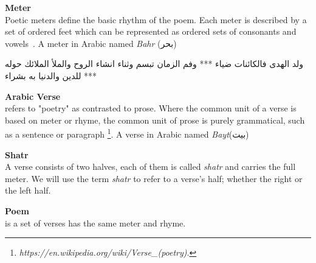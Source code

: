 
    \newpage
\begin{definition}\label{def:meter}
  \textbf{Meter} \hfill \\
  Poetic meters define the basic rhythm of the poem. Each meter is described by a set of ordered feet which can be represented as ordered sets of consonants and vowels~\cite{Almuhareb2015}. A meter in Arabic named \textit{Bahr}   (\textarabic{بحر})
\begin{Arabic}
	\begin{traditionalpoem*}
          ولد الهدى فالكائنات ضياء *** وفم الزمان تبسم وثناء انشاء
          الروح والملأ الملائك حوله *** للدين والدنيا به بشراء

	\end{traditionalpoem*}
\end{Arabic}%
\end{definition}

\begin{definition}\label{def:verse}
  \textbf{Arabic Verse} \hfill \\ refers to "poetry" as contrasted to prose. Where the common unit of a verse is based on meter or rhyme, the common unit of prose is purely grammatical, such as a sentence or paragraph \footnote{\textit{ https://en.wikipedia.org/wiki/Verse\_(poetry)}.}. A verse in Arabic named \textit{Bayt}(\textarabic{بيت})
\end{definition}

\begin{definition}\label{def:shatr}
  \textbf{Shatr} \hfill \\  A verse consists of two halves, each of them is called \textit{shatr} and carries the full meter.  We will use the term \textit{shatr} to refer to a verse's half; whether the right or the left half.
\end{definition}

\begin{definition}\label{def:poem}
  \textbf{Poem} \hfill \\  is a set of verses has the same meter and rhyme.
\end{definition}
\newpage

